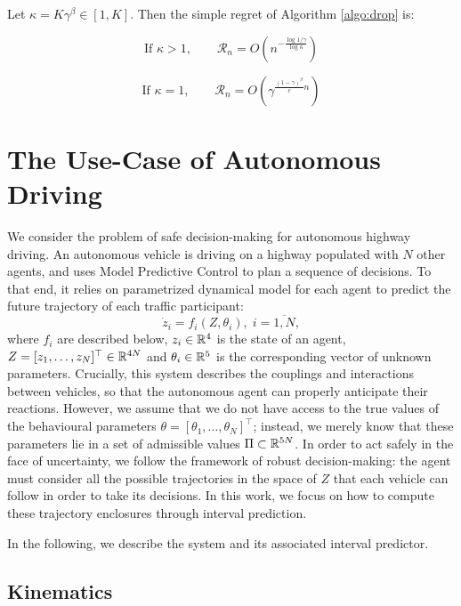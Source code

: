 \documentclass{article}
\begin{document}
\begin{theorem}
\label{theorem:drop-regret}
Let $\kappa = K\gamma^\beta \in [1, K]$. Then the simple regret of Algorithm \ref{algo:drop} is:


\begin{equation}
\text{If } \kappa>1,\qquad 
\mathcal{R}_n = O\left(n^{-\frac{\log 1/\gamma}{\log \kappa}}\right)
\end{equation}

\begin{equation}
\text{If }\kappa=1,\qquad
\mathcal{R}_n = O\left(\gamma^{\frac{(1-\gamma)^\beta}{c}n}\right)
\end{equation}
\end{theorem}

\section{The Use-Case of Autonomous Driving}


We consider the problem of safe decision-making for autonomous highway driving. An autonomous vehicle is driving on a highway populated with $N$ other agents, and uses Model Predictive Control to plan a sequence of decisions. To that end, it relies on parametrized dynamical model for each agent to predict the future trajectory of each traffic participant: \[\dot{z}_i=f_i(Z,\theta_i),\;i=\overline{1,N},\] where $f_i$ are described below, $z_i\in\mathbb{R}^4$ is the state of an agent, $Z = [z_1,\dots,z_N]^\top\in\mathbb{R}^{4N}$ and $\theta_i\in\mathbb{R}^5$ is the corresponding vector of unknown parameters. Crucially, this system describes the couplings and interactions between vehicles, so that the autonomous agent can properly anticipate their reactions. 
However, we assume that we do not have access to the true values of the behavioural parameters $\theta=[\theta_1,\dots,\theta_N]^\top$; instead, we merely know that these parameters lie in a set of admissible values $\Pi\subset\mathbb{R}^{5N}$. In order to act safely in the face of uncertainty, we follow the framework of robust decision-making: the agent must consider all the possible trajectories in the space of $Z$ that each vehicle can follow in order to take its decisions. In this work, we focus on how to compute these trajectory enclosures through interval prediction.

In the following, we describe the system and its associated interval predictor.

\subsection{Kinematics}
\end{document}
